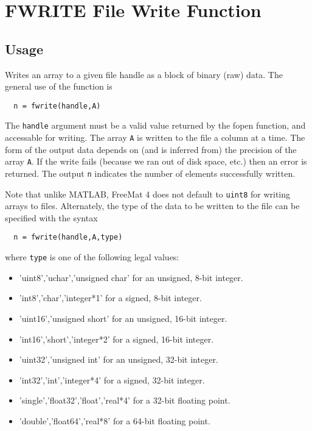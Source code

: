 \section{FWRITE File Write Function}

\subsection{Usage}

Writes an array to a given file handle as a block of binary (raw) data.
The general use of the function is
\begin{verbatim}
  n = fwrite(handle,A)
\end{verbatim}
The \verb|handle| argument must be a valid value returned by the fopen 
function, and accessable for writing. The array \verb|A| is written to
the file a column at a time.  The form of the output data depends
on (and is inferred from) the precision of the array \verb|A|.  If the 
write fails (because we ran out of disk space, etc.) then an error
is returned.  The output \verb|n| indicates the number of elements
successfully written.

Note that unlike MATLAB, FreeMat 4 does not default to \verb|uint8| for
writing arrays to files.  Alternately, the type of the data to be
written to the file can be specified with the syntax
\begin{verbatim}
  n = fwrite(handle,A,type)
\end{verbatim}
where \verb|type| is one of the following legal values:
\begin{itemize}
\item  'uint8','uchar','unsigned char' for an unsigned, 8-bit integer.

\item  'int8','char','integer*1' for a signed, 8-bit integer.

\item  'uint16','unsigned short' for an unsigned, 16-bit  integer.

\item  'int16','short','integer*2' for a signed, 16-bit integer.

\item  'uint32','unsigned int' for an unsigned, 32-bit integer.

\item  'int32','int','integer*4' for a signed, 32-bit integer.

\item  'single','float32','float','real*4' for a 32-bit floating point.

\item  'double','float64','real*8' for a 64-bit floating point.

\end{itemize}

